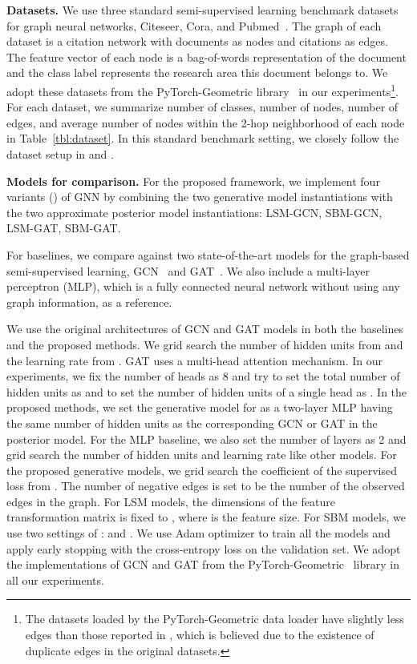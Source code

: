 \documentclass{article}
\newcommand{\vpara}[1]{\vspace{0.05in}\noindent\textbf{#1 }}
\begin{document}
\vpara{Datasets.}
We use three standard semi-supervised learning benchmark datasets for graph neural networks, Citeseer, Cora, and Pubmed~\cite{sen2008collective,yang2016revisiting}. The graph  of each dataset is a citation network with documents as nodes and citations as edges. The feature vector of each node is a bag-of-words representation of the document and the class label represents the research area this document belongs to. We adopt these datasets from the PyTorch-Geometric library~\cite{fey2019fast} in our experiments\footnote{The datasets loaded by the PyTorch-Geometric data loader have slightly less edges than those reported in \citet{yang2016revisiting}, which is believed due to the existence of duplicate edges in the original datasets.}. For each dataset, we summarize number of classes, number of nodes, number of edges, and average number of nodes within the 2-hop neighborhood of each node in Table~\ref{tbl:dataset}. In this standard benchmark setting, we closely follow the dataset setup in \citet{yang2016revisiting} and \citet{kipf2016semi}. 

\vpara{Models for comparison.}
For the proposed framework, we implement four variants () of GNN by combining the two generative model instantiations with the two approximate posterior model instantiations: LSM-GCN, SBM-GCN, LSM-GAT, SBM-GAT.

For baselines, we compare against two state-of-the-art models for the graph-based semi-supervised learning, GCN~\cite{kipf2016semi} and GAT~\cite{velivckovic2017graph}. We also include a multi-layer perceptron (MLP), which is a fully connected neural network without using any graph information, as a reference. 

We use the original architectures of GCN and GAT models in both the baselines and the proposed methods. We grid search the number of hidden units from  and the learning rate from . GAT uses a multi-head attention mechanism. In our experiments, we fix the number of heads as 8 and try to set the total number of hidden units as  and to set the number of hidden units of a single head as . In the proposed methods, we set the generative model for  as a two-layer MLP having the same number of hidden units as the corresponding GCN or GAT in the posterior model. For the MLP baseline, we also set the number of layers as 2 and grid search the number of hidden units and learning rate like other models. For the proposed generative models, we grid search the coefficient of the supervised loss  from . The number of negative edges is set to be the number of the observed edges in the graph. For LSM models, the dimensions of the feature transformation matrix  is fixed to , where  is the feature size. For SBM models, we use two settings of :  and . We use Adam optimizer to train all the models and apply early stopping with the cross-entropy loss on the validation set. We adopt the implementations of GCN and GAT from the PyTorch-Geometric~\cite{fey2019fast} library in all our experiments.
\end{document}
